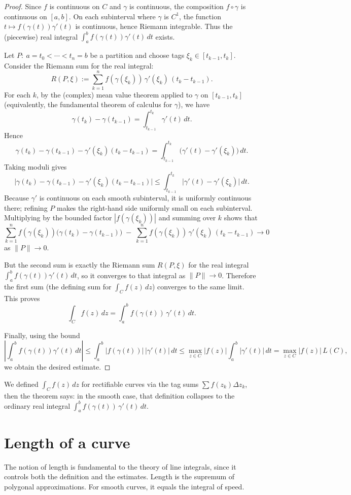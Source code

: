 \documentclass{article}
\begin{document}
\begin{proof}
Since $f$ is continuous on $C$ and $\gamma$ is continuous, the composition
$f\circ\gamma$ is continuous on $[a,b]$. On each subinterval where $\gamma$ is $C^1$,
the function $t\mapsto f(\gamma(t))\gamma'(t)$ is continuous, hence Riemann integrable.
Thus the (piecewise) real integral $\int_a^b f(\gamma(t))\gamma'(t)\,dt$ exists.

Let $P:\ a=t_0<\cdots<t_n=b$ be a partition and choose tags $\xi_k\in[t_{k-1},t_k]$.
Consider the Riemann sum for the real integral:
\[
R(P,\xi):=\sum_{k=1}^n f(\gamma(\xi_k))\,\gamma'(\xi_k)\,(t_k-t_{k-1}).
\]
For each $k$, by the (complex) mean value theorem applied to $\gamma$ on
$[t_{k-1},t_k]$ (equivalently, the fundamental theorem of calculus for $\gamma$),
we have
\[
\gamma(t_k)-\gamma(t_{k-1})=\int_{t_{k-1}}^{t_k}\gamma'(t)\,dt.
\]
Hence
\[
\gamma(t_k)-\gamma(t_{k-1})-\gamma'(\xi_k)(t_k-t_{k-1})
=\int_{t_{k-1}}^{t_k}\big(\gamma'(t)-\gamma'(\xi_k)\big)\,dt.
\]
Taking moduli gives
\[
\Big|\gamma(t_k)-\gamma(t_{k-1})-\gamma'(\xi_k)(t_k-t_{k-1})\Big|
\le \int_{t_{k-1}}^{t_k}\big|\gamma'(t)-\gamma'(\xi_k)\big|\,dt.
\]
Because $\gamma'$ is continuous on each smooth subinterval, it is uniformly continuous
there; refining $P$ makes the right-hand side uniformly small on each subinterval.
Multiplying by the bounded factor $|f(\gamma(\xi_k))|$ and summing over $k$ shows that
\[
\sum_{k=1}^n f(\gamma(\xi_k))\big(\gamma(t_k)-\gamma(t_{k-1})\big)
\;-\;
\sum_{k=1}^n f(\gamma(\xi_k))\,\gamma'(\xi_k)\,(t_k-t_{k-1})
\longrightarrow 0
\]
as $\|P\|\to 0$.

But the second sum is exactly the Riemann sum $R(P,\xi)$ for the real integral
$\int_a^b f(\gamma(t))\gamma'(t)\,dt$, so it converges to that integral as $\|P\|\to 0$.
Therefore the first sum (the defining sum for $\int_C f(z)\,dz$) converges to the same
limit. This proves
\[
\int_C f(z)\,dz=\int_a^b f(\gamma(t))\,\gamma'(t)\,dt.
\]

Finally, using the bound
\[
\left|\int_a^b f(\gamma(t))\gamma'(t)\,dt\right|
\le \int_a^b |f(\gamma(t))|\,|\gamma'(t)|\,dt
\le \max_{z\in C}|f(z)|\int_a^b |\gamma'(t)|\,dt
= \max_{z\in C}|f(z)|\,L(C),
\]
we obtain the desired estimate.
\end{proof}
We defined $\int_C f(z)\,dz$ for rectifiable curves via the tag sums $\sum f(z_k)\Delta z_k$, then the theorem says: in the smooth case, that definition collapses to the ordinary real integral $\int_a^b f(\gamma(t))\,\gamma'(t)\,dt$.
\section{Length of a curve}
The notion of length is fundamental to the theory of line integrals, since it controls both the definition and the estimates. Length is the supremum of polygonal approximations. For smooth curves, it equals the integral of speed.
\end{document}
